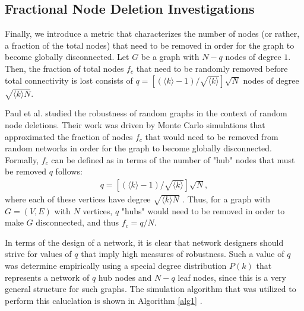 \documentclass[doc]{apa}%
\newcounter{numberedAlg}%
\newenvironment{numberedAlg}[1][]%
  {%
    \needspace{2\baselineskip}%
    \noindent \rule{\linewidth}{1pt} \endgraf%
    \refstepcounter{numberedAlg}%
    \centering \textsc{Algorithm}~\thenumberedAlg%
    \ifthenelse{\isempty{#1}}{}{:\ #1}%
  }{%
  \noindent \rule{\linewidth}{1pt}%
  }%
\begin{document}
\subsection{Fractional Node Deletion Investigations}

Finally, we introduce a metric that characterizes the number of nodes (or rather, a fraction of the total nodes) that need to be removed in order for the graph to become globally disconnected. Let $G$ be a graph with $N - q$ nodes of degree $1$. Then, the fraction of total nodes $f_c$ that need to be randomly removed before total connectivity is lost consists of $q = [(\langle k \rangle - 1) / \sqrt{\langle k \rangle}]\sqrt{N}$ nodes of degree $\sqrt{\langle k \rangle N}$. 

Paul et al. studied the robustness of random graphs in the context of random node deletions. Their work was driven by Monte Carlo simulations that approximated the fraction of nodes $f_c$ that would need to be removed from random networks in order for the graph to become globally disconnected. Formally, $f_c$ can be defined as in terms of the number of "hub" nodes that must be removed $q$ follows:
\begin{eqnarray*}
q = \left[(\langle k \rangle - 1) / \sqrt{\langle k \rangle}\right]\sqrt{N},
\end{eqnarray*}
where each of these vertices have degree $\sqrt{\langle k \rangle N}$ \cite{asd}. Thus, for a graph with $G = (V,E)$ with $N$ vertices, $q$ "hubs" would need to be removed in order to make $G$ disconnected, and thus $f_c = q/N$.

In terms of the design of a network, it is clear that network designers should strive for values of $q$ that imply high measures of robustness. Such a value of $q$ was determine empirically using a special degree distribution $P(k)$ that represents a network of $q$ hub nodes and $N-q$ leaf nodes, since this is a very general structure for such graphs. The simulation algorithm that was utilized to perform this caluclation is shown in Algorithm \ref{alg1} \cite{asd}. %

\end{document}
